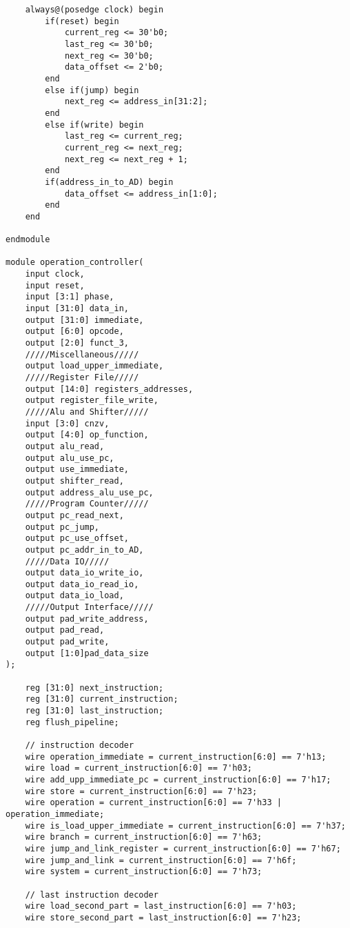 \begin{lstlisting}
    always@(posedge clock) begin
        if(reset) begin
            current_reg <= 30'b0;
            last_reg <= 30'b0;
            next_reg <= 30'b0;
            data_offset <= 2'b0;
        end
        else if(jump) begin
            next_reg <= address_in[31:2];
        end
        else if(write) begin
            last_reg <= current_reg;
            current_reg <= next_reg;
            next_reg <= next_reg + 1;
        end
        if(address_in_to_AD) begin
            data_offset <= address_in[1:0];
        end
    end

endmodule

module operation_controller(
    input clock,
    input reset,
    input [3:1] phase,
    input [31:0] data_in,
    output [31:0] immediate,
    output [6:0] opcode,
    output [2:0] funct_3,
    /////Miscellaneous/////
    output load_upper_immediate,
    /////Register File/////
    output [14:0] registers_addresses,
    output register_file_write,
    /////Alu and Shifter/////
    input [3:0] cnzv,
    output [4:0] op_function,
    output alu_read,
    output alu_use_pc,
    output use_immediate,
    output shifter_read,
    output address_alu_use_pc,
    /////Program Counter/////
    output pc_read_next,
    output pc_jump,
    output pc_use_offset,
    output pc_addr_in_to_AD,
    /////Data IO/////
    output data_io_write_io,
    output data_io_read_io,
    output data_io_load,
    /////Output Interface/////
    output pad_write_address,
    output pad_read,
    output pad_write,
    output [1:0]pad_data_size
);

    reg [31:0] next_instruction;
    reg [31:0] current_instruction;
    reg [31:0] last_instruction;
    reg flush_pipeline;

    // instruction decoder
    wire operation_immediate = current_instruction[6:0] == 7'h13;
    wire load = current_instruction[6:0] == 7'h03;
    wire add_upp_immediate_pc = current_instruction[6:0] == 7'h17;
    wire store = current_instruction[6:0] == 7'h23;
    wire operation = current_instruction[6:0] == 7'h33 | operation_immediate;
    wire is_load_upper_immediate = current_instruction[6:0] == 7'h37;
    wire branch = current_instruction[6:0] == 7'h63;
    wire jump_and_link_register = current_instruction[6:0] == 7'h67;
    wire jump_and_link = current_instruction[6:0] == 7'h6f;
    wire system = current_instruction[6:0] == 7'h73;

    // last instruction decoder
    wire load_second_part = last_instruction[6:0] == 7'h03;
    wire store_second_part = last_instruction[6:0] == 7'h23;


\end{lstlisting}

